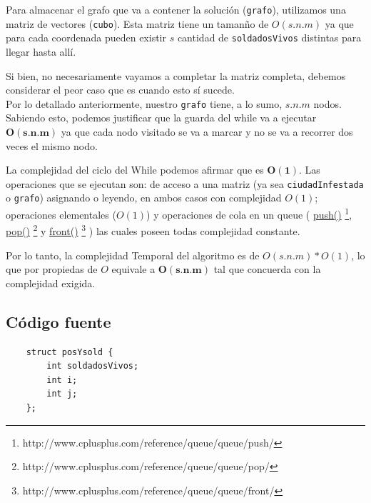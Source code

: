 Para almacenar el grafo que va a contener la soluci\'on (\texttt{grafo}), utilizamos una matriz de vectores (\texttt{cubo}). Esta matriz tiene un taman\~no de $O(s.n.m)$ ya que para cada coordenada pueden existir $s$ cantidad de \texttt{soldadosVivos} distintas para llegar hasta all\'i.

Si bien, no necesariamente vayamos a completar la matriz completa, debemos considerar el peor caso que es cuando esto s\'i sucede.\\

Por lo detallado anteriormente, nuestro \texttt{grafo} tiene, a lo sumo, $s.n.m$ nodos. Sabiendo esto, podemos justificar que la guarda del while va a ejecutar  $\mathbf{O(s.n.m)}$ ya que cada nodo visitado se va a marcar y no se va a recorrer dos veces el mismo nodo.

La complejidad del ciclo del While podemos afirmar que es $\mathbf{O(1)}$. Las operaciones que se ejecutan son: de acceso a una matriz (ya sea \texttt{ciudadInfestada} o \texttt{grafo}) asignando o leyendo, en ambos casos con complejidad $O(1)$; operaciones elementales ($O(1)$) y operaciones de cola en un queue (
\href{http://www.cplusplus.com/reference/queue/queue/push/}{push()} \footnote{http://www.cplusplus.com/reference/queue/queue/push/}, 
\href{http://www.cplusplus.com/reference/queue/queue/pop/}{pop()} \footnote{http://www.cplusplus.com/reference/queue/queue/pop/} y 
\href{http://www.cplusplus.com/reference/queue/queue/front/}{front()} \footnote{http://www.cplusplus.com/reference/queue/queue/front/}
) las cuales poseen todas complejidad constante.\\

\bigskip

Por lo tanto, la complejidad Temporal del algoritmo es de $O(s.n.m)*O(1)$, lo que por propiedas de $O$ equivale a $\mathbf{O(s.n.m)}$ tal que concuerda con la complejidad exigida.

\newpage

\subsection{C\'odigo fuente}
	\begin{codesnippet}
	\begin{verbatim}
    struct posYsold {
        int soldadosVivos;
        int i;
        int j;
    };
	\end{verbatim}
	\end{codesnippet}

